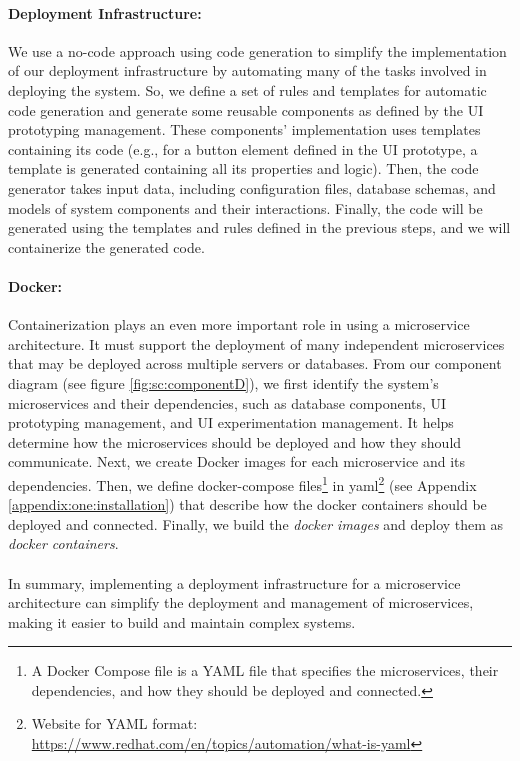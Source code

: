 \paragraph{Deployment Infrastructure:}
We use a no-code approach using code generation to simplify the implementation of our deployment infrastructure by automating many of the tasks involved in deploying the system.
So, we define a set of rules and templates for automatic code generation and generate some reusable components as defined by the UI prototyping management. 
These components' implementation uses templates containing its code (e.g., for a button element defined in the UI prototype, a template is generated containing all its properties and logic).
Then, the code generator takes input data, including configuration files, database schemas, and models of system components and their interactions. 
Finally, the code will be generated using the templates and rules defined in the previous steps, and we will containerize the generated code. 

\paragraph{Docker:}
Containerization plays an even more important role in using a microservice architecture. 
It must support the deployment of many independent microservices that may be deployed across multiple servers or databases.
From our component diagram (see figure \ref{fig:sc:componentD}), we first identify the system's microservices and their dependencies, such as database components, UI prototyping management, and UI experimentation management. 
It helps determine how the microservices should be deployed and how they should communicate.
Next, we create Docker images for each microservice and its dependencies.
Then, we define docker-compose files\footnote{A Docker Compose file is a YAML file that specifies the microservices, their dependencies, and how they should be deployed and connected.} in yaml\footnote{Website for YAML format: \url{https://www.redhat.com/en/topics/automation/what-is-yaml}} (see Appendix \ref{appendix:one:installation}) that describe how the docker containers should be deployed and connected.
Finally, we build the \textit{docker images} and deploy them as \textit{docker containers}. \\\\
In summary, implementing a deployment infrastructure for a microservice architecture can simplify the deployment and management of microservices, making it easier to build and maintain complex systems.

